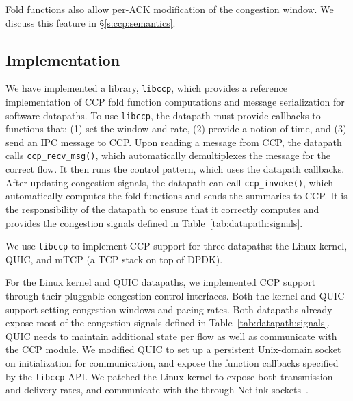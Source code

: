 Fold functions also allow per-ACK modification of the congestion window. We discuss this feature in \S\ref{s:ccp:semantics}. 
%
%
\subsection{Implementation}
\label{s:datapath:libccp}

We have implemented a library, \texttt{libccp}, which provides a reference implementation of CCP fold function computations and message serialization for software datapaths. 
To use \texttt{libccp}, the datapath must provide callbacks to functions that: (1) set the window and rate, (2) provide a notion of time, and (3) send an IPC message to CCP. 
Upon reading a message from CCP, the datapath calls \texttt{ccp\_recv\_msg()}, which automatically demultiplexes the message for the correct flow. It then runs the control pattern, which uses the datapath callbacks.
After updating congestion signals, the datapath can call \texttt{ccp\_invoke()}, which automatically computes the fold functions and sends the summaries to CCP. 
It is the responsibility of the datapath to ensure that it correctly computes and provides the congestion signals defined in Table~\ref{tab:datapath:signals}.

We use \texttt{libccp} to implement CCP support for three datapaths: the Linux kernel, QUIC, and mTCP (a \userspace{} TCP stack on top of DPDK).

For the Linux kernel and QUIC datapaths, we implemented CCP support through their pluggable congestion control interfaces. Both the kernel and QUIC support setting congestion windows and pacing rates. Both datapaths already expose most of the congestion signals defined in Table~\ref{tab:datapath:signals}. 
QUIC needs to maintain additional state per flow as well as communicate with the \userspace{} CCP module. We modified QUIC to set up a persistent Unix-domain socket on initialization for communication, and expose the function callbacks specified by the \texttt{libccp} API. We patched the Linux kernel to expose both transmission and delivery rates, and communicate with the \userspace through Netlink sockets~\cite{netlink}.

